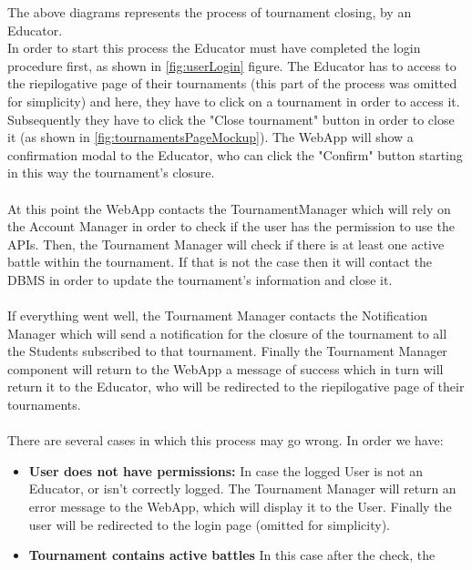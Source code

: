 \documentclass{article}
\begin{document}
{        The above diagrams represents the process of tournament closing, by an Educator. \\
        In order to start this process the Educator must have completed the login procedure
        first, as shown in \ref{fig:userLogin} figure.
        The Educator has to access to the riepilogative page of their tournaments 
        (this part of the process was omitted for simplicity) and here, they have to click 
        on a tournament in order to access it. Subsequently they have to click the "Close tournament" button
        in order to close it (as shown in \ref{fig:tournamentsPageMockup}).
        The WebApp will show a confirmation modal to the Educator, who can click the "Confirm"
        button starting in this way the tournament's closure. 
        \\ \\
        At this point the WebApp contacts the TournamentManager which will rely on the Account
        Manager in order to check if the user has the permission to use the APIs.
        Then, the Tournament Manager will check if there is at least one active battle within the
        tournament. If that is not the case then it will contact the DBMS in order to update the
        tournament's information and close it.
        \\ \\
        If everything went well, the Tournament Manager contacts the Notification
        Manager which will send a notification for the closure of the tournament to all the 
        Students subscribed to that tournament. 
        Finally the Tournament Manager component will return to the WebApp a message of success
        which in turn will return it to the Educator, who will be redirected to the 
        riepilogative page of their tournaments.
        \\ \\
        There are several cases in which this process may go wrong. In order we have:
        \begin{itemize}
            \item \textbf{User does not have permissions:} In case the logged User is not an
            Educator, or isn't correctly logged. The Tournament Manager will return an
            error message to the WebApp, which will display it to the User.
            Finally the user will be redirected to the login page (omitted for simplicity).
            \item \textbf{Tournament contains active battles} In this case after the check, the 

\end{itemize}}
\end{document}
